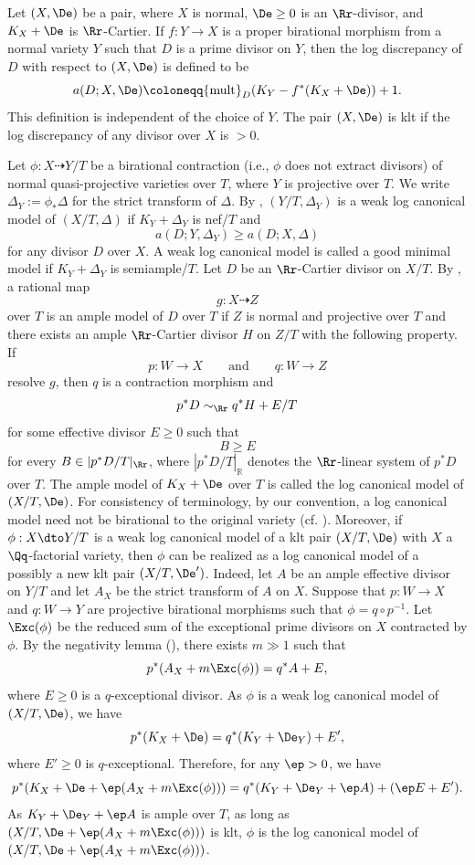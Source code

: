 \documentclass[12pt]{amsart}
\begin{document}
Let $(X,\De)$ be a pair, where $X$ is normal, $\De\geq0$ is an $\Rr$-divisor, and $K_X+\De$ is $\Rr$-Cartier. If $f\colon Y \to X$ is a proper birational morphism from a normal variety \(Y\) such that $D$ is a prime divisor on $Y$, then the log discrepancy of $D$ with respect to $(X, \De)$ is defined to be
\[a(D; X,\De) \coloneqq {\rm mult}_D(K_Y-f^*(K_X + \De)) + 1.\]
This definition is independent of the choice of $Y$. The pair $(X,\De)$ is klt if the log discrepancy of any divisor over $X$ is $> 0$. 



Let
\(\phi\colon X \dashrightarrow Y/T\) be a birational contraction
(i.e., \(\phi\) does not extract divisors) of normal quasi-projective
varieties over \(T\), where \(Y\) is projective over \(T\). We write
\(\Delta_Y := \phi_*\Delta\) for the strict transform of \(\Delta\).
By \cite[Definition~3.6.7]{BCHM10}, \((Y/T,\Delta_Y)\) is a weak log canonical model of
\((X/T,\Delta)\) if \(K_Y+\Delta_Y\) is nef/\(T\) and
\[
a(D;Y,\Delta_Y) \geq a(D;X,\Delta)
\]
for any divisor \(D\) over \(X\). A weak log canonical model is called a good minimal model if \(K_Y+\Delta_Y\) is semiample/\(T\). Let $D$ be an $\Rr$-Cartier divisor on $X/T$. By \cite[Definition~3.6.5]{BCHM10}, a rational map
\[
g\colon X\dashrightarrow Z
\]
over $T$ is an ample model of $D$ over $T$ if $Z$ is normal and projective over $T$ and there exists an ample $\Rr$-Cartier divisor $H$ on $Z/T$ with the following property. If
\[
p\colon W\to X
\qquad\text{and}\qquad
q\colon W\to Z
\]
resolve $g$, then $q$ is a contraction morphism and
\[
p^*D\sim_{\Rr}q^*H+E/T
\]
for some effective divisor $E\geq0$ such that
\[
B\geq E
\]
for every $B\in|p^*D/T|_{\Rr}$, where $|p^*D/T|_{\mathbb{R}}$ denotes the $\Rr$-linear system of $p^*D$ over $T$. The ample model of $K_X+\De$ over $T$ is called the log canonical model of $(X/T,\De)$. For consistency of terminology, by our convention, a log canonical model need not be birational to the original variety (cf. \cite{BCHM10}). Moreover, if $\phi: X \dto Y/T$ is a weak log canonical model of a klt pair $(X/T,\De)$ with $X$ a $\Qq$-factorial variety, then $\phi$ can be realized as a log canonical model of a possibly a new klt pair $(X/T, \De')$. Indeed, let $A$ be an ample effective divisor on $Y/T$ and let $A_X$ be the strict transform of $A$ on $X$. Suppose that $p\colon W \to X$ and $q\colon W\to Y$ are projective birational morphisms such that $\phi=q\circ p^{-1}$. Let $\Exc(\phi)$ be the reduced sum of the exceptional prime divisors on $X$ contracted by $\phi$. By the negativity lemma (\cite[Lemma 3.39]{KM98}), there exists $m \gg 1$ such that
\[
p^*(A_X+m\Exc(\phi))=q^*A+E,
\] where $E \geq 0$ is a $q$-exceptional divisor. As $\phi$ is a weak log canonical model of $(X/T, \De)$, we have
\[
p^*(K_X+\De)=q^*(K_Y+\De_Y)+E',
\] where $E'\geq 0$ is $q$-exceptional. Therefore, for any $\ep>0$, we have
\[
p^*(K_X+\De+\ep(A_X+m\Exc(\phi)))=q^*(K_Y+\De_Y+\ep A)+(\ep E+E').
\] As $K_Y+\De_Y+\ep A$ is ample over $T$, as long as $(X/T, \De+\ep(A_X+m\Exc(\phi)))$ is klt, $\phi$ is the log canonical model of $(X/T, \De+\ep(A_X+m\Exc(\phi)))$. 
\end{document}
